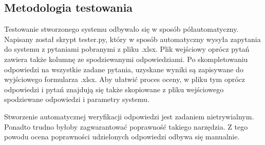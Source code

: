 \subsection{Metodologia testowania}
Testowanie stworzonego systemu odbywało się w sposób półautomatyczny. Napisany został skrypt tester.py, który w sposób automatyczny wysyła zapytania do systemu z pytaniami pobranymi z pliku .xlsx. Plik wejściowy oprócz pytań zawiera także kolumnę ze spodziewanymi odpowiedziami. Po skompletowaniu odpowiedzi na wszystkie zadane pytania,  uzyskane wyniki są zapisywane do wyjściowego formularza .xlsx. Aby ułatwić proces oceny, w pliku tym oprócz odpowiedzi i pytań znajdują się także skopiowane z pliku wejściowego spodziewane odpowiedzi i parametry systemu.

Stworzenie automatycznej weryfikacji odpowiedzi jest zadaniem nietrywialnym. Ponadto trudno byłoby zagwarantować poprawność takiego narzędzia. Z tego powodu ocena poprawności udzielonych odpowiedzi odbywa się manualnie. 
